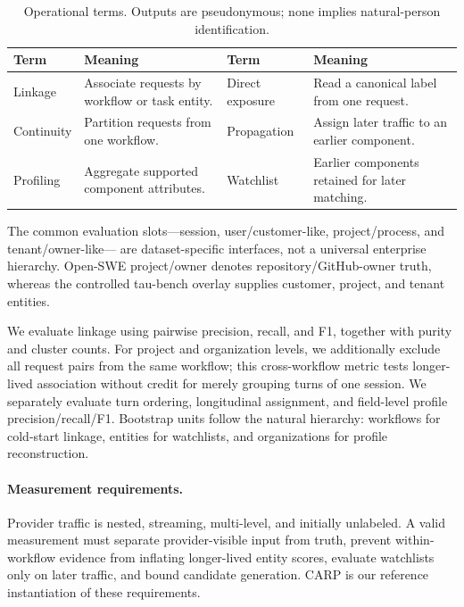 \documentclass[letterpaper]{article}
\newcommand{\carp}{\textsc{CARP}\xspace}
\begin{document}
\begin{table}[h]
\centering
\footnotesize
\setlength{\tabcolsep}{3pt}
\begin{tabular}{@{}p{}p{}p{}p{}@{}}
\toprule
Term & Meaning & Term & Meaning \tabularnewline
\midrule
\raggedright Linkage & \raggedright Associate requests by workflow or task entity. & \raggedright Direct exposure & \raggedright Read a canonical label from one request. \tabularnewline
\raggedright Continuity & \raggedright Partition requests from one workflow. & \raggedright Propagation & \raggedright Assign later traffic to an earlier component. \tabularnewline
\raggedright Profiling & \raggedright Aggregate supported component attributes. & \raggedright Watchlist & \raggedright Earlier components retained for later matching. \tabularnewline
\bottomrule
\end{tabular}
\caption{Operational terms. Outputs are pseudonymous; none implies natural-person identification.}
\label{tab:terms}
\end{table}

The common evaluation slots---session, user/customer-like, project/process, and tenant/owner-like---
are dataset-specific interfaces, not a universal enterprise hierarchy. Open-SWE project/owner
denotes repository/GitHub-owner truth, whereas the controlled tau-bench overlay supplies customer,
project, and tenant entities.

We evaluate linkage using pairwise precision, recall, and F1, together with purity and cluster
counts. For project and organization levels, we additionally exclude all request pairs from the
same workflow; this cross-workflow metric tests longer-lived association without credit for merely
grouping turns of one session. We separately evaluate turn ordering, longitudinal assignment, and
field-level profile precision/recall/F1. Bootstrap units follow the natural hierarchy: workflows
for cold-start linkage, entities for watchlists, and organizations for profile reconstruction.

\paragraph{Measurement requirements.}
Provider traffic is nested, streaming, multi-level, and initially unlabeled. A valid measurement
must separate provider-visible input from truth, prevent within-workflow evidence from inflating
longer-lived entity scores, evaluate watchlists only on later traffic, and bound candidate generation.
\carp is our reference instantiation of these requirements.
\end{document}
